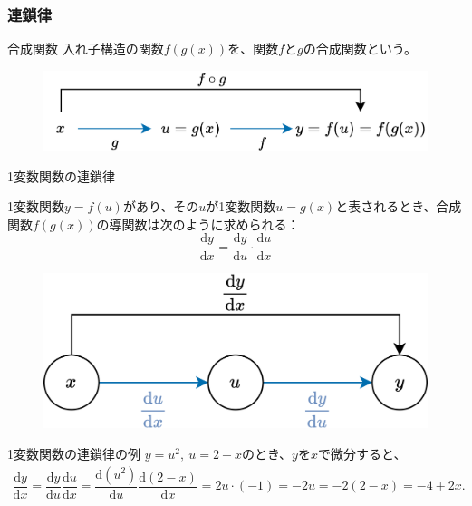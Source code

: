 \documentclass[dvipdfmx,aspectratio=169]{beamer}
\begin{document}
	\subsubsection{連鎖律}
	\begin{frame}{合成関数}
		入れ子構造の関数$ f(g(x)) $を、関数$ f $と$ g $の\alert{合成関数}という。
		\begin{figure}
			\centering
			\includegraphics[width=0.7\linewidth]{img/composite-function}
		\end{figure}
	\end{frame}
	\begin{frame}{1変数関数の連鎖律}
		\begin{screen}
			1変数関数$ y = f(u) $があり、その$ u $が1変数関数$ u = g(x) $と表されるとき、合成関数$ f(g(x)) $の導関数は次のように求められる：
			\begin{equation*}
				\dfrac{\mathrm{d}y}{\mathrm{d}x} = \dfrac{\mathrm{d}y}{\mathrm{d}u} \cdot \dfrac{\mathrm{d}u}{\mathrm{d}x}
			\end{equation*}
		\end{screen}
		\begin{figure}
			\centering
			\includegraphics[width=0.65\linewidth]{img/chain-rule-at-1-variable}
		\end{figure}
	\end{frame}
	\begin{frame}{1変数関数の連鎖律の例}
		$ y = u^2,\ u = 2-x $のとき、$ y $を$ x $で微分すると、
		\begin{align*}
			\dfrac{\mathrm{d}y}{\mathrm{d}x} = \dfrac{\mathrm{d}y}{\mathrm{d}u} \dfrac{\mathrm{d}u}{\mathrm{d}x} = \dfrac{\mathrm{d}(u^2)}{\mathrm{d}u} \dfrac{\mathrm{d}(2-x)}{\mathrm{d}x} = 2u \cdot (-1) = -2u = -2(2-x) = -4+2x.
		\end{align*}
	\end{frame}
\end{document}
